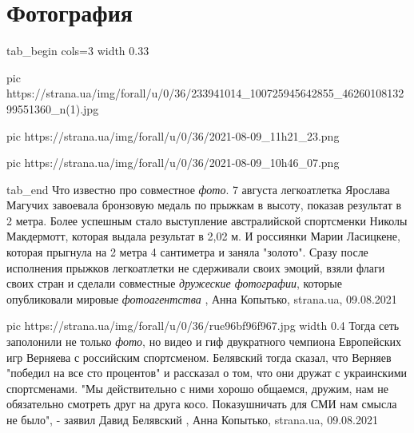  
 
 
 
 
\chapter{Фотография}
\label{sec:slova.fotografia}

\ifcmt
  tab_begin cols=3
		width 0.33

     pic https://strana.ua/img/forall/u/0/36/233941014_100725945642855_4626010813299551360_n(1).jpg

     pic https://strana.ua/img/forall/u/0/36/2021-08-09_11h21_23.png

		 pic https://strana.ua/img/forall/u/0/36/2021-08-09_10h46_07.png

  tab_end
\fi
Что известно про совместное \emph{фото}.  7 августа легкоатлетка Ярослава
Магучих завоевала бронзовую медаль по прыжкам в высоту, показав результат в 2
метра.  Более успешным стало выступление австралийской спортсменки Николы
Макдермотт, которая выдала результат в 2,02 м. И россиянки Марии Ласицкене,
которая прыгнула на 2 метра 4 сантиметра и заняла "золото".  Сразу после
исполнения прыжков легкоатлетки не сдерживали своих эмоций, взяли флаги своих
стран и сделали совместные \emph{дружеские фотографии}, которые опубликовали
мировые \emph{фотоагентства}
, 
Анна Копытько, strana.ua, 09.08.2021

\ifcmt
  pic https://strana.ua/img/forall/u/0/36/rue96bf96f967.jpg
  width 0.4
\fi
Тогда сеть заполонили не только \emph{фото}, но видео и гиф двукратного чемпиона
Европейских игр Верняева с российским спортсменом.
Белявский тогда сказал, что Верняев "победил на все сто процентов" и рассказал
о том, что они дружат с украинскими спортсменами. "Мы действительно с ними
хорошо общаемся, дружим, нам не обязательно смотреть друг на друга косо.
Показушничать для СМИ нам смысла не было", - заявил Давид Белявский
, 
Анна Копытько, strana.ua, 09.08.2021

